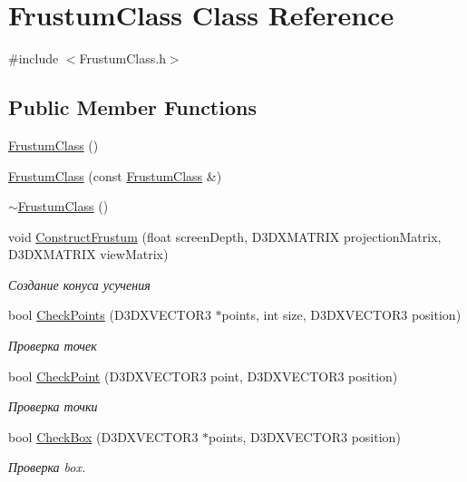 \hypertarget{class_frustum_class}{}\section{Frustum\+Class Class Reference}
\label{class_frustum_class}


{\ttfamily \#include $<$Frustum\+Class.\+h$>$}

\subsection*{Public Member Functions}
\begin{DoxyCompactItemize}
\item 
\hyperlink{class_frustum_class_a62130bf46eceff05f1fd7362d826a518}{Frustum\+Class} ()
\item 
\hyperlink{class_frustum_class_a3e4fb03cda7e5382639522186908d673}{Frustum\+Class} (const \hyperlink{class_frustum_class}{Frustum\+Class} \&)
\item 
\hyperlink{class_frustum_class_ad109f05c5a62469d444de601de6caa72}{$\sim$\+Frustum\+Class} ()
\item 
void \hyperlink{class_frustum_class_a2b4644f9251b253b588c7500d1a61987}{Construct\+Frustum} (float screen\+Depth, D3\+D\+X\+M\+A\+T\+R\+IX projection\+Matrix, D3\+D\+X\+M\+A\+T\+R\+IX view\+Matrix)
\begin{DoxyCompactList}\small\item\em Создание конуса усучения \end{DoxyCompactList}\item 
bool \hyperlink{class_frustum_class_ab02265dfa7f8cfdd45432c4d426c627e}{Check\+Points} (D3\+D\+X\+V\+E\+C\+T\+O\+R3 $\ast$points, int size, D3\+D\+X\+V\+E\+C\+T\+O\+R3 position)
\begin{DoxyCompactList}\small\item\em Проверка точек \end{DoxyCompactList}\item 
bool \hyperlink{class_frustum_class_adfb3c7eddbec59e38f88577b877248d7}{Check\+Point} (D3\+D\+X\+V\+E\+C\+T\+O\+R3 point, D3\+D\+X\+V\+E\+C\+T\+O\+R3 position)
\begin{DoxyCompactList}\small\item\em Проверка точки \end{DoxyCompactList}\item 
bool \hyperlink{class_frustum_class_ad49aa8ba27e6dc6ccb7beef4c53fd856}{Check\+Box} (D3\+D\+X\+V\+E\+C\+T\+O\+R3 $\ast$points, D3\+D\+X\+V\+E\+C\+T\+O\+R3 position)
\begin{DoxyCompactList}\small\item\em Проверка box. \end{DoxyCompactList}\end{DoxyCompactItemize}

